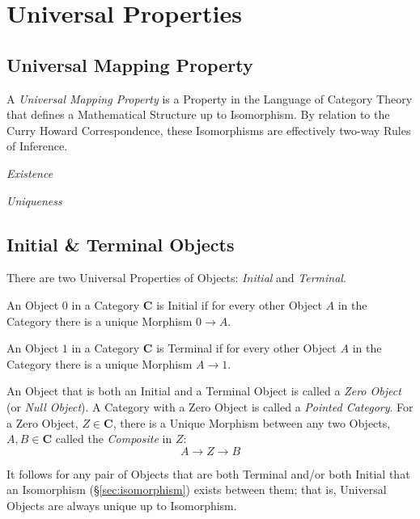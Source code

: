 \section{Universal Properties}\label{sec:universal_property}

\subsection{Universal Mapping Property}
\label{sec:universal_mapping_property}

A \emph{Universal Mapping Property} is a Property in the Language of
Category Theory that defines a Mathematical Structure up to
Isomorphism. By relation to the Curry Howard Correspondence, these
Isomorphisms are effectively two-way Rules of Inference.

\emph{Existence}

\emph{Uniqueness}



\subsection{Initial \& Terminal Objects}\label{sec:initial_terminal}

There are two Universal Properties of Objects: \emph{Initial} and
\emph{Terminal}.

An Object $0$ in a Category $\mathbf{C}$ is Initial if for every other
Object $A$ in the Category there is a unique Morphism $0 \rightarrow
A$.

An Object $1$ in a Category $\mathbf{C}$ is Terminal if for every
other Object $A$ in the Category there is a unique Morphism $A
\rightarrow 1$.

An Object that is both an Initial and a Terminal Object is called a
\emph{Zero Object} (or \emph{Null Object}). A Category with a Zero
Object is called a \emph{Pointed Category}. For a Zero Object, $Z \in
\mathbf{C}$, there is a Unique Morphism between any two Objects, $A, B
\in \mathbf{C}$ called the \emph{Composite} in $Z$:
\[
    A \rightarrow Z \rightarrow B
\]

It follows for any pair of Objects that are both Terminal and/or both
Initial that an Isomorphism (\S\ref{sec:isomorphism}) exists
between them; that is, Universal Objects are always unique up to
Isomorphism.


